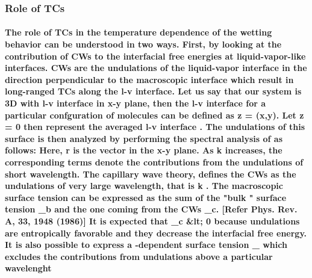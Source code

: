 \documentclass[a4paper,12pt,single,pdftex]{scrartcl}
\begin{document}
\label{ID_1942058277}\subsubsection{Role of TCs}

\label{ID_896680657}\paragraph{The role of TCs in the temperature dependence of the wetting behavior can be understood in two ways. First, by looking at the contribution of CWs to the interfacial free energies at liquid-vapor-like interfaces. CWs are the undulations of the liquid-vapor interface in the direction perpendicular to the macroscopic interface which result in long-ranged TCs along the l-v interface. Let us say that our system is 3D with l-v interface in x-y plane, then the l-v interface for a particular confguration of molecules can be defined as z = \xi (x,y). Let z = 0 then represent the averaged l-v interface . The undulations of this surface is then analyzed by performing the spectral analysis of \xi as follows: Here, r is the vector  in the x-y plane. As k increases, the corresponding terms denote the contributions from the undulations of short wavelength. The capillary wave theory, defines the CWs as the undulations of very large wavelength, that is k . The macroscopic surface tension  \sigma can be expressed as the sum of the "bulk " surface tension  \sigma_b and the one coming from the CWs \sigma_c. [Refer Phys. Rev. A, 33, 1948 (1986)] It is expected that \sigma_c &lt; 0 because undulations are entropically favorable and they decrease the interfacial free energy.  It is also possible to express a \lambda-dependent surface tension \sigma_{\lambda} which excludes the contributions from undulations above a particular wavelenght \lambda}
\end{document}
